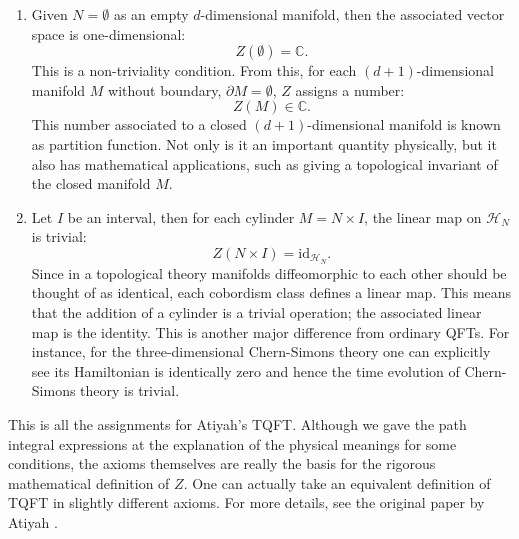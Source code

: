 \begin{enumerate}
  \item Given $N=\emptyset$ as an empty $d$-dimensional manifold, then the
associated vector space is one-dimensional:
\begin{equation}
  Z(\emptyset)  =  \mathbb{C}.
\end{equation}
This is a non-triviality condition. From this, for each $(d+1)$-dimensional
manifold $M$ without boundary, $\partial M=\emptyset$, $Z$ assigns
a number:
\begin{equation}
  Z(M)  \in  \mathbb{C}.
\end{equation}
This number associated to a closed $(d+1)$-dimensional manifold
is known as partition function. Not only is it an important quantity
physically, but it also has mathematical applications, such as giving
a topological invariant of the closed manifold $M$.
\item Let $I$ be an interval, then for each cylinder $M=N\times I$, the
linear map on $\mathcal{H}_{N}$ is trivial:
\begin{equation}
  Z(N\times I)  =  \mathrm{id}_{\mathcal{H}_{N}}.
\end{equation}
Since in a topological theory manifolds diffeomorphic to each other
should be thought of as identical, each cobordism class defines
a linear map. This means that the addition of a cylinder is a trivial
operation; the associated linear map is the identity. This
is another major difference from ordinary QFTs. For instance, for the three-dimensional
Chern-Simons theory one can explicitly see its Hamiltonian is identically
zero and hence the time evolution of Chern-Simons theory is trivial.
\end{enumerate}
%
This is all the assignments for Atiyah's TQFT. Although we gave the
path integral expressions at the explanation of the physical meanings
for some conditions, the axioms themselves are really the basis for
the rigorous mathematical definition of $Z$. One can actually take
an equivalent definition of TQFT in slightly different axioms. For
more details, see the original paper by Atiyah \cite{Atiyah:1989vu}.

